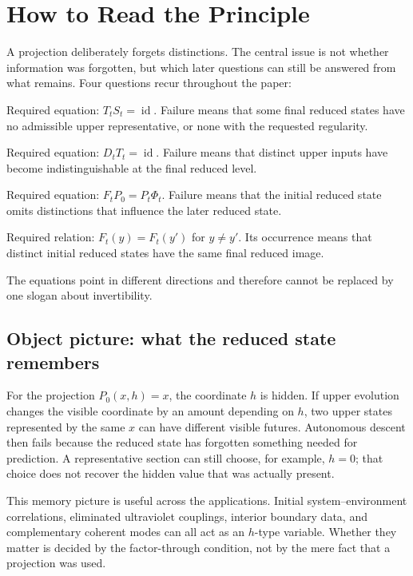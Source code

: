 \documentclass[11pt]{article}
\begin{document}
\tableofcontents

\section{How to Read the Principle}

A projection deliberately forgets distinctions.  The central issue is not
whether information was forgotten, but which later questions can still be
answered from what remains.  Four questions recur throughout the paper:
\begin{description}[leftmargin=3.4cm,style=nextline]
\item[Choose a representative.]
Required equation: $T_tS_t=\operatorname{id}$.  Failure means that some final
reduced states have no admissible upper representative, or none with the
requested regularity.
\item[Recover the actual input.]
Required equation: $D_tT_t=\operatorname{id}$.  Failure means that distinct
upper inputs have become indistinguishable at the final reduced level.
\item[Evolve autonomously.]
Required equation: $F_tP_0=P_t\Phi_t$.  Failure means that the initial reduced
state omits distinctions that influence the later reduced state.
\item[Detect a merger.]
Required relation: $F_t(y)=F_t(y')$ for $y\ne y'$.  Its occurrence means that
distinct initial reduced states have the same final reduced image.
\end{description}
The equations point in different directions and therefore cannot be replaced
by one slogan about invertibility.

\subsection{Object picture: what the reduced state remembers}

For the projection $P_0(x,h)=x$, the coordinate $h$ is hidden.  If upper
evolution changes the visible coordinate by an amount depending on $h$, two
upper states represented by the same $x$ can have different visible futures.
Autonomous descent then fails because the reduced state has forgotten
something needed for prediction.  A representative section can still choose,
for example, $h=0$; that choice does not recover the hidden value that was
actually present.

This memory picture is useful across the applications.  Initial
system--environment correlations, eliminated ultraviolet couplings, interior
boundary data, and complementary coherent modes can all act as an $h$-type
variable.  Whether they matter is decided by the factor-through condition,
not by the mere fact that a projection was used.
\end{document}
